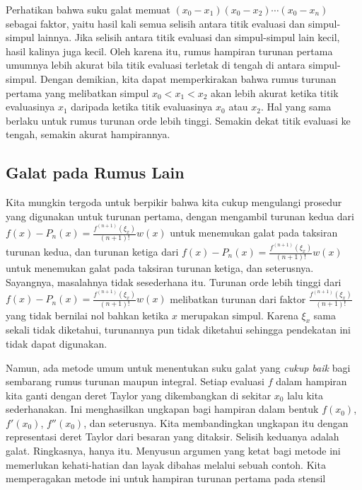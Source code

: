 Perhatikan bahwa suku galat memuat $(x_{0}-x_{1})(x_{0}-x_{2})\cdots(x_{0}-x_{n})$
sebagai faktor, yaitu hasil kali semua selisih antara titik evaluasi
dan simpul-simpul lainnya. Jika selisih antara titik evaluasi dan
simpul-simpul lain kecil, hasil kalinya juga kecil. Oleh karena itu,
rumus hampiran turunan pertama umumnya lebih akurat bila titik evaluasi
terletak di tengah di antara simpul-simpul. Dengan demikian, kita
dapat memperkirakan bahwa rumus turunan pertama yang melibatkan simpul
$x_{0}<x_{1}<x_{2}$ akan lebih akurat ketika titik evaluasinya $x_{1}$
daripada ketika titik evaluasinya $x_{0}$ atau $x_{2}$. Hal yang
sama berlaku untuk rumus turunan orde lebih tinggi. Semakin dekat
titik evaluasi ke tengah, semakin akurat hampirannya.

\subsection{Galat pada Rumus Lain\label{subsec:derivativeError}}

Kita mungkin tergoda untuk berpikir bahwa kita cukup mengulangi prosedur
yang digunakan untuk turunan pertama, dengan mengambil turunan kedua
dari $f(x)-P_{n}(x)=\frac{f^{(n+1)}(\xi_{x})}{(n+1)!}w(x)$ untuk
menemukan galat pada taksiran turunan kedua, dan turunan ketiga dari
$f(x)-P_{n}(x)=\frac{f^{(n+1)}(\xi_{x})}{(n+1)!}w(x)$ untuk menemukan
galat pada taksiran turunan ketiga, dan seterusnya. Sayangnya, masalahnya
tidak sesederhana itu. Turunan orde lebih tinggi dari $f(x)-P_{n}(x)=\frac{f^{(n+1)}(\xi_{x})}{(n+1)!}w(x)$
melibatkan turunan dari faktor $\frac{f^{(n+1)}(\xi_{x})}{(n+1)!}$
yang tidak bernilai nol bahkan ketika $x$ merupakan simpul. Karena
$\xi_{x}$ sama sekali tidak diketahui, turunannya pun tidak diketahui
sehingga pendekatan ini tidak dapat digunakan.

Namun, ada metode umum untuk menentukan suku galat yang \textit{cukup
baik} bagi sembarang rumus turunan maupun integral. Setiap evaluasi
$f$ dalam hampiran kita ganti dengan deret Taylor yang dikembangkan
di sekitar $x_{0}$ lalu kita sederhanakan. Ini menghasilkan ungkapan
bagi hampiran dalam bentuk $f(x_{0})$, $f'(x_{0})$, $f''(x_{0})$,
dan seterusnya. Kita membandingkan ungkapan itu dengan representasi
deret Taylor dari besaran yang ditaksir. Selisih keduanya adalah galat.
Ringkasnya, hanya itu. Menyusun argumen yang ketat bagi metode ini
memerlukan kehati-hatian dan layak dibahas melalui sebuah contoh.
Kita memperagakan metode ini untuk hampiran turunan pertama pada stensil

